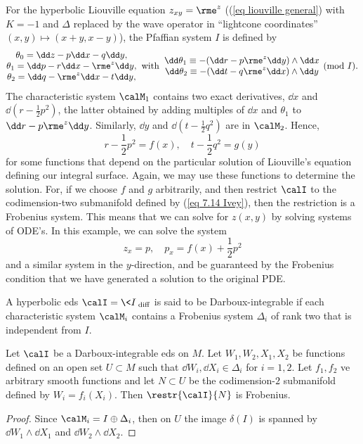 \begin{example}\label{ex 7.3.6 Ivey}
    For the hyperbolic Liouville equation $z_{xy}=\rme^z$ ((\ref{eq liouville general}) with $K=-1$ and $\Delta$ replaced by the wave operator in ``lightcone coordinates'' $(x,y)\mapsto (x+y,x-y)$), the Pfaffian system $I$ is defined by 
    \[
    \begin{matrix}
        \theta_0=\dd z-p\dd x-q\dd y,\\
        \theta_1=\dd p-r\dd x-\rme^z\dd y,\\
        \theta_2=\dd q-\rme^z\dd x-t\dd y,
    \end{matrix}    
    \;\;\text{with}\;\;
    \begin{matrix}
        \dd\theta_1\equiv -(\dd r-p\rme^z \dd y)\wedge \dd x\\
        \dd\theta_2\equiv -(\dd t-q\rme^z \dd x)\wedge \dd y
    \end{matrix}\pmod{I}.
    \]
    The characteristic system $\calM_1$ contains two exact derivatives, $\dd x$ and $\dd (r-\frac12 p^2)$, the latter obtained by adding multiples of $\dd x$ and $\theta_1$ to $\dd r-p\rme^z\dd y$. Similarly, $\dd y$ and $\dd(t-\frac12 q^2)$ are in $\calM_2$. Hence, 
    \[r-\frac12 p^2=f(x),\quad t-\frac12 q^2=g(y)\label{eq 7.14 Ivey}\]
    for some functions that depend on the particular solution of Liouville's equation defining our integral surface. Again, we may use these functions to determine the solution. For, if we choose $f$ and $g$ arbitrarily, and then restrict $\calI$ to the codimension-two submanifold defined by (\ref{eq 7.14 Ivey}), then the restriction is a Frobenius system. This means that we can solve for $z(x,y)$ by solving systems of ODE's. In this example, we can solve the system 
    \[z_x=p,\quad p_x=f(x)+\frac12 p^2\label{eq 7.15 Ivey}\]
    and a similar system in the $y$-direction, and be guaranteed by the Frobenius condition that we have generated a solution to the original PDE.
\end{example}

\begin{defn}
    A hyperbolic \gls{eds} $\calI=\<I\>_{\mathrm{diff}}$ is said to be Darboux-integrable if each characteristic system $\calM_i$ contains a Frobenius system $\Delta_i$ of rank two that is independent from $I$.
\end{defn}

\begin{prop}\label{prop 7.3.8 Ivey}
    Let $\calI$ be a Darboux-integrable \gls{eds} on $M$. Let $W_1,W_2,X_1,X_2$ be functions defined on an open set $U\subset M$ such that $\dd W_i,\dd X_i\in \Delta_i$ for $i=1,2$. Let $f_1,f_2$ ve arbitrary smooth functions and let $N\subset U$ be the codimension-$2$ submanifold defined by $W_i=f_i(X_i)$. Then $\restr{\calI}{N}$ is Frobenius.
\end{prop}
\begin{proof}
    Since $\calM_i=I\oplus\Delta_i$, then on $U$ the image $\delta(I)$ is spanned by $\dd W_1\wedge\dd X_1$ and $\dd W_2\wedge \dd X_2$.
\end{proof}


